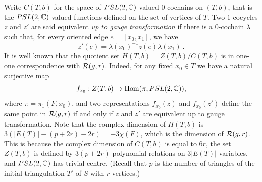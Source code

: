 Write $C(T,b)$ for the space of $PSL(2,{\mathbb C})$-valued $0$-cochains on
$(T,b)$, that is the $PSL(2,{\mathbb C})$-valued functions defined on the
set of vertices of $T$.  Two $1$-cocycles $z$ and $z'$ are said
equivalent {\it up to gauge transformation} if there is a
$0$-cochain $\lambda$ such that, for every oriented edge
$e=[x_0,x_1]$, we have $$z'(e) = \lambda(x_0)^{-1}z(e)\lambda(x_1)
\ . $$ It is well known that the quotient set $H(T,b) =
Z(T,b)/C(T,b)$ is in one-one correspondence with ${\mathcal R}(g,r)$.
Indeed, for any fixed $x_0 \in T$ we have a natural surjective map
$$f_{x_0}: Z(T,b) \to {\rm Hom}(\pi, PSL(2,{\mathbb C})),$$ where
$\pi=\pi_1(F,x_0)$, and two representations $f_{x_0}(z)$ and
$f_{x_0}(z')$ define the same point in ${\mathcal R}(g,r)$ if and only if
$z$ and $z'$ are equivalent up to gauge transformation. Note that
the complex dimension of $H(T,b)$ is $3(|E(T)| - (p+2r) - 2r) =
-3\chi(F)$, which is the dimension of ${\mathcal R}(g,r)$. This is because
the complex dimension of $C(T,b)$ is equal to $6r$, the set
$Z(T,b)$ is defined by $3(p+2r)$ polynomial relations on $3|E(T)|$
variables, and $PSL(2,{\mathbb C})$ has trivial centre. (Recall that $p$ is
the number of triangles of the initial triangulation $T'$ of $S$
with $r$ vertices.)

